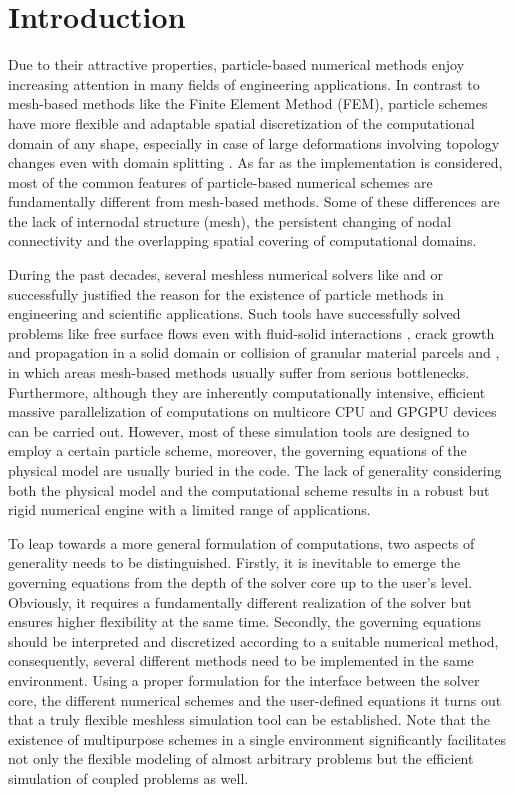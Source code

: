 \documentclass[a4paper,12pt,openany]{book}
\theoremstyle{break}
\begin{document}
\tableofcontents

\mainmatter
\raggedbottom
\section{Introduction}
Due to their attractive properties, particle-based numerical methods enjoy increasing attention in many fields of engineering applications. In contrast to mesh-based methods like the Finite Element Method (FEM), particle schemes have more flexible and adaptable spatial discretization of the computational domain of any shape, especially in case of large deformations involving topology changes even with domain splitting \cite{Shaofan2007}.
As far as the implementation is considered, most of the common features of particle-based numerical schemes are fundamentally different from mesh-based methods. Some of these differences are the lack of internodal structure (mesh), the persistent changing of nodal connectivity and the overlapping spatial covering of computational domains.

During the past decades, several meshless numerical solvers like \cite{GPUSPH} and \cite{LIGGGTHS2012} or \cite{GADGET2} successfully justified the reason for the existence of particle methods in engineering and scientific applications. Such tools have successfully solved problems like free surface flows \cite{Monaghan1994} even with fluid-solid interactions \cite{Antoci2007}, crack growth and propagation in a solid domain \cite{Zhang2010} or collision of granular material parcels \cite{Maoa2004} and \cite{Kun1996}, in which areas mesh-based methods usually suffer from serious bottlenecks. Furthermore, although they are inherently computationally intensive, efficient massive parallelization of computations on multicore CPU and GPGPU devices \cite{DualSPHysics} can be carried out. However, most of these simulation tools are designed to employ a certain particle scheme, moreover, the governing equations of the physical model are usually buried in the code. The lack of generality considering both the physical model and the computational scheme results in a robust but rigid numerical engine with a limited range of applications. %

To leap towards a more general formulation of computations, two aspects of generality needs to be distinguished. Firstly, it is inevitable to emerge the governing equations from the depth of the solver core up to the user's level. Obviously, it requires a fundamentally different realization of the solver but ensures higher flexibility at the same time. Secondly, the governing equations should be interpreted and discretized according to a suitable numerical method, consequently, several different methods need to be implemented in the same environment. Using a proper formulation for the interface between the solver core, the different numerical schemes and the user-defined equations it turns out that a truly flexible meshless simulation tool can be established. Note that the existence of multipurpose schemes in a single environment significantly facilitates not only the flexible modeling of almost arbitrary problems but the efficient simulation of coupled problems as well.
\end{document}
